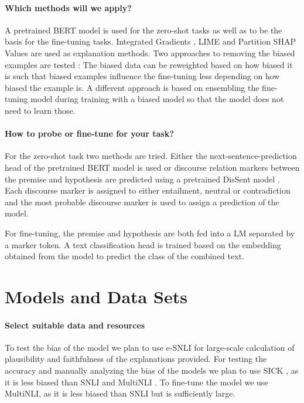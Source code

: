 \documentclass[12pt,a4paper]{article}
\begin{document}
\paragraph{Which methods will we apply?} A pretrained BERT model \parencite{devlin2018bert} is used for the zero-shot tasks as well as to be the basis for the fine-tuning tasks. Integrated Gradients \parencite{sundararajan2017integratedgradients}, LIME \parencite{ribeiro2016lime} and Partition SHAP Values \parencite{lundberg2017shap} are used as explanation methods. Two approaches to removing the biased examples are tested \parencite{clark2019don}: The biased data can be reweighted based on how biased it is such that biased examples influence the fine-tuning less depending on how biased the example is. A different approach is based on ensembling the fine-tuning model during training with a biased model so that the model does not need to learn those.

\paragraph{How to probe or fine-tune for your task?} For the zero-shot task two methods are tried. Either the next-sentence-prediction head of the pretrained BERT model is used or discourse relation markers between the premise and hypothesis are predicted using a pretrained DisSent model \parencite{nie2017dissent}. Each discourse marker is assigned to either entailment, neutral or contradiction and the most probable discourse marker is used to assign a prediction of the model.

For fine-tuning, the premise and hypothesis are both fed into a \ac{LM} separated by a marker token. A text classification head is trained based on the embedding obtained from the model to predict the class of the combined text. 

\section{Models and Data Sets}
\paragraph{Select suitable data and resources}
To test the bias of the model we plan to use e-SNLI \parencite{camburu2018esnli} for large-scale calculation of plausibility and faithfulness of the explanations provided. For testing the accuracy and manually analyzing the bias of the models we plan to use SICK \parencite{marelli2014sick}, as it is less biased than SNLI \parencite{bowman2015snli} and MultiNLI \parencite{williams2018multinli}. To fine-tune the model we use MultiNLI, as it is less biased than SNLI but is sufficiently large.
\end{document}
